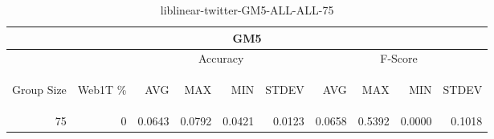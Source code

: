 \begin{center}
\begin{table}[htbp] 
 \begin{center}
\begin{tabular}{ | r | r | r | r | r | r | r | r | r | r |}
\hline
\multicolumn{10}{|c|}{GM5}\\
\hline
 & & \multicolumn{4}{|c|}{Accuracy} & \multicolumn{4}{|c|}{F-Score}\\ \cline{3-10}
\begin{sideways}Group Size\end{sideways} & \begin{sideways}Web1T \%\end{sideways} & \begin{sideways}AVG\end{sideways} & \begin{sideways}MAX\end{sideways} & \begin{sideways}MIN\end{sideways} & \begin{sideways}STDEV\end{sideways} & \begin{sideways}AVG\end{sideways} & \begin{sideways}MAX\end{sideways} & \begin{sideways}MIN\end{sideways} & \begin{sideways}STDEV\end{sideways}\\
\hline
\multirow{0}{*}{75}
 & 0 & 0.0643 & 0.0792 & 0.0421 & 0.0123 & 0.0658 & 0.5392 & 0.0000 & 0.1018\\ \cline{2-10}
\hline
\end{tabular}
\caption{liblinear-twitter-GM5-ALL-ALL-75}
\label{table:liblinear-twitter-GM5-ALL-ALL-75}
\end{center}
 \end{table}
\end{center}

